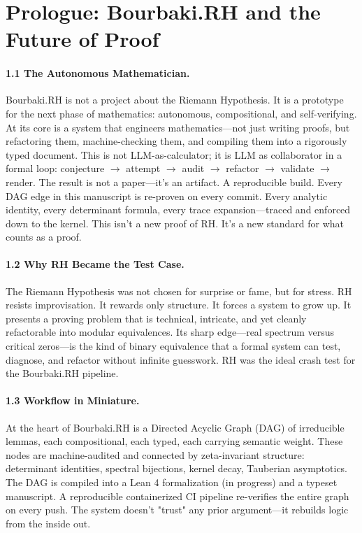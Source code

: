 \section*{Prologue: Bourbaki.RH and the Future of Proof}
\label{sec:prologue}

\paragraph*{1.1 The Autonomous Mathematician.}
Bourbaki.RH is not a project about the Riemann Hypothesis. It is a prototype for the next phase of mathematics: autonomous, compositional, and self-verifying. At its core is a system that engineers mathematics—not just writing proofs, but refactoring them, machine-checking them, and compiling them into a rigorously typed document. This is not LLM-as-calculator; it is LLM as collaborator in a formal loop: conjecture $\rightarrow$ attempt $\rightarrow$ audit $\rightarrow$ refactor $\rightarrow$ validate $\rightarrow$ render. The result is not a paper—it’s an artifact. A reproducible build. Every DAG edge in this manuscript is re-proven on every commit. Every analytic identity, every determinant formula, every trace expansion—traced and enforced down to the kernel. This isn't a new proof of RH. It's a new standard for what counts as a proof.

\paragraph*{1.2 Why RH Became the Test Case.}
The Riemann Hypothesis was not chosen for surprise or fame, but for stress. RH resists improvisation. It rewards only structure. It forces a system to grow up. It presents a proving problem that is technical, intricate, and yet cleanly refactorable into modular equivalences. Its sharp edge—real spectrum versus critical zeros—is the kind of binary equivalence that a formal system can test, diagnose, and refactor without infinite guesswork. RH was the ideal crash test for the Bourbaki.RH pipeline.

\paragraph*{1.3 Workflow in Miniature.}
At the heart of Bourbaki.RH is a Directed Acyclic Graph (DAG) of irreducible lemmas, each compositional, each typed, each carrying semantic weight. These nodes are machine-audited and connected by zeta-invariant structure: determinant identities, spectral bijections, kernel decay, Tauberian asymptotics. The DAG is compiled into a Lean 4 formalization (in progress) and a typeset manuscript. A reproducible containerized CI pipeline re-verifies the entire graph on every push. The system doesn’t "trust" any prior argument—it rebuilds logic from the inside out.

